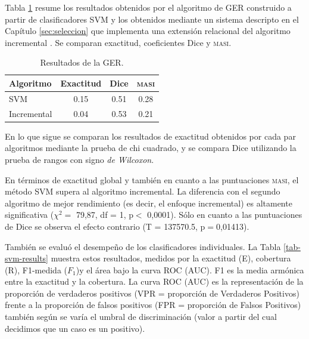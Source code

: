 Tabla \ref{tab-reg-results} resume los resultados obtenidos por el algoritmo de GER construido a partir de clasificadores SVM y los obtenidos mediante un sistema descripto en el Cap\'itulo \ref{sec:seleccion} que implementa una extensi\'on relacional del algoritmo incremental \cite{incremental}. Se comparan exactitud, coeficientes Dice y \textsc{masi}.
\medskip
\begin{table}[h]
\begin{center}
\begin{tabular} {  l c c c }
\hline
{Algoritmo}							& {Exactitud} 	& { Dice}		& \textsc{masi} \\ \hline 
SVM											& 0.15		& 0.51			& 0.28 \\
Incremental							& 0.04		& 0.53			& 0.21 \\
\hline
\end{tabular}
\end{center}
\vspace*{-0.5cm}
\caption{Resultados de la GER.}
\label{tab-reg-results}
\end{table}

En lo que sigue se comparan los resultados de exactitud obtenidos por cada par algoritmos mediante la prueba de chi cuadrado, y se compara Dice utilizando la prueba de rangos con signo {\em de Wilcoxon}.

En t\'erminos de exactitud global y tambi\'en en cuanto a las puntuaciones \textsc{masi}, el m\'etodo SVM supera al algoritmo incremental. La diferencia con el segundo algoritmo de mejor rendimiento (es decir, el enfoque incremental) es altamente significativa ($\chi^{2}=$ 79,87, df = 1, p$<$ 0,0001). S\'olo en cuanto a las puntuaciones de Dice se observa el efecto contrario (T = 137570.5, p$=$0,01413).

Tambi\'en se evalu\'o el desempe\~no de los clasificadores individuales. La Tabla \ref{tab-svm-results} muestra estos resultados, medidos por la exactitud (E), cobertura (R), F1-medida ($F_{1}$)y el \'area bajo la curva ROC (AUC). F1 es la media arm\'onica entre la exactitud y la cobertura. La curva ROC (AUC) es la representaci\'on de la proporci\'on de verdaderos positivos (VPR = proporci\'on de Verdaderos Positivos) frente a la proporci\'on de falsos positivos (FPR = proporci\'on de Falsos Positivos) tambi\'en seg\'un se var\'ia el umbral de discriminaci\'on (valor a partir del cual decidimos que un caso es un positivo).


